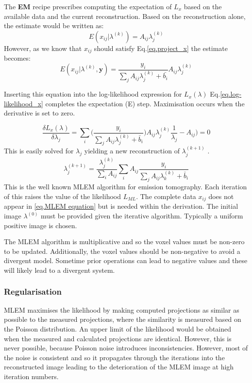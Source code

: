 \documentclass{article}
\begin{document}
The \textbf{EM} recipe prescribes computing the expectation of $L_x$ based on the available data and the current reconstruction. Based on the reconstruction alone, the estimate would be written as:
\begin{equation}
E(x_{ij}|\lambda^{(k)}) = A_{ij}\lambda_j^{(k)}
\end{equation}
However, as we know that $x_{ij}$ should satisfy Eq.\ref{eq.project_x}  the estimate becomes:
\begin{equation}
E(x_{ij}|\lambda^{(k)},\textbf{y}) =  \frac{y_i}{\sum_j A_{ij}\lambda_j^{(k)} + \bar{b_i}}    A_{ij}\lambda_j^{(k)}
\end{equation}

Inserting this equation into the log-likelihood expression for $L_x(\lambda)$ Eq.\ref{eq.log-likelihood_x} completes the expectation (E) step. Maximisation occurs when the derivative is set to zero.

\begin{equation} \label{eq.LikelihoodGradient}
\frac{\delta L_x(\lambda)}{\delta\lambda_j} = \sum_i \bigg( \frac{y_i}{\sum_j A_{ij}\lambda_j^{(k)} + \bar{b}_i}\bigg) A_{ij}\lambda_j^{(k)} \frac{1}{\lambda_j} - A_{ij}\bigg)  = 0
\end{equation}
This is easily solved for $\lambda_j$ yielding a new reconstruction of $\lambda_j ^{(k+1)}$ .
\begin{equation}\label{eq.MLEM equation}
\lambda_j ^{(k+1)} = \frac{\lambda_j ^{(k)}}{\sum_i A_{ij}}\sum_i A_{ij}\frac{y_i}{\sum_j A_{ij}\lambda_k^{(k)}+\bar{b}_i}
\end{equation}
This is the well known MLEM algorithm for emission tomography. Each iteration of this raises the value of the likelihood $L_{ML}$. The complete data $x_{ij}$ does not appear in \ref{eq.MLEM equation} but is needed within the derivation. The initial image $\lambda^{(0)}$ must be provided given the iterative algorithm. Typically a uniform positive image is chosen. 

The MLEM algorithm is multiplicative and so the voxel values must be non-zero to be updated. Additionally, the voxel values should be non-negative to avoid a divergent model. Sometime prior operations can lead to negative values and these will likely lead to a divergent system.

\subsubsection{Regularisation}
MLEM maximises the likelihood by making computed projections as similar as possible to the measured projections, where the similarity is measured based on the Poisson distribution. An upper limit of the  likelihood would be obtained when the measured and calculated projections are identical. However, this is never possible, because Poisson noise introduces inconsistencies. However, most of the noise is consistent and so it propagates through the iterations into the reconstructed image leading to the deterioration of the MLEM image at high iteration numbers.
\end{document}
